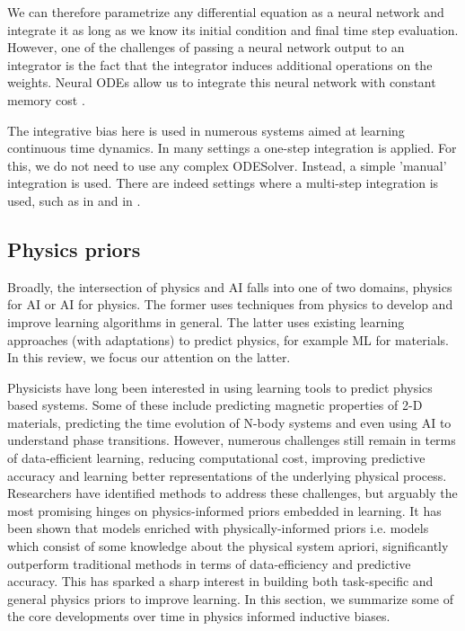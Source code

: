 \documentclass{article}
\begin{document}
We can therefore parametrize any differential equation as a neural network and integrate it as long as we know its initial condition and final time step evaluation. However, one of the challenges of passing a neural network output to an integrator is the fact that the integrator induces additional operations on the weights. Neural ODEs allow us to integrate this neural network with constant memory cost \cite{chen_neural_2018}.

The integrative bias here is used in numerous systems aimed at learning continuous time dynamics. In many settings a one-step integration is applied. For this, we do not need to use any complex ODESolver. Instead, a simple 'manual' integration is used. There are indeed settings where a multi-step integration is used, such as in \cite{zhong_symplectic_2019} and in \cite{saemundsson_variational_2019}.

\subsection{Physics priors}

Broadly, the intersection of physics and AI falls into one of two domains, physics for AI or AI for physics. The former uses techniques from physics to develop and improve learning algorithms in general. The latter uses existing learning approaches (with adaptations) to predict physics, for example ML for materials. In this review, we focus our attention on the latter.

Physicists have long been interested in using learning tools to predict physics based systems. Some of these include predicting magnetic properties of 2-D materials, predicting the time evolution of N-body systems and even using AI to understand phase transitions. However, numerous challenges still remain in terms of data-efficient learning, reducing computational cost, improving predictive accuracy and learning better representations of the underlying physical process. Researchers have identified methods to address these challenges, but arguably the most promising hinges on physics-informed priors embedded in learning. It has been shown that models enriched with physically-informed priors i.e. models which consist of some knowledge about the physical system apriori, significantly outperform traditional methods in terms of data-efficiency and predictive accuracy. This has sparked a sharp interest in building both task-specific and general physics priors to improve learning. In this section, we summarize some of the core developments over time in physics informed inductive biases. 
\end{document}

